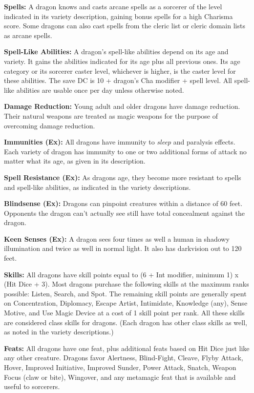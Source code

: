 \documentclass{article}
\begin{document}
\textbf{Spells:} A dragon knows and casts arcane spells as a sorcerer of the level 
indicated in its variety description, gaining bonus spells for a high Charisma 
score. Some dragons can also cast spells from the cleric list or cleric domain 
lists as arcane spells.

\textbf{Spell-Like Abilities:} A dragon's spell-like abilities depend on its age 
and variety. It gains the abilities indicated for its age plus all previous ones. 
Its age category or its sorcerer caster level, whichever is higher, is the caster 
level for these abilities. The save DC is 10 + dragon's Cha modifier + spell level. 
All spell-like abilities are usable once per day unless otherwise noted.

\textbf{Damage Reduction:} Young adult and older dragons have damage reduction. 
Their natural weapons are treated as magic weapons for the purpose of overcoming 
damage reduction.

\textbf{Immunities (Ex):} All dragons have immunity to \textit{sleep }and paralysis 
effects. Each variety of dragon has immunity to one or two additional forms of 
attack no matter what its age, as given in its description.

\textbf{Spell Resistance (Ex):} As dragons age, they become more resistant to spells 
and spell-like abilities, as indicated in the variety descriptions.

\textbf{Blindsense (Ex):} Dragons can pinpoint creatures within a distance of 60 
feet. Opponents the dragon can't actually see still have total concealment against 
the dragon.

\textbf{Keen Senses (Ex):} A dragon sees four times as well a human in shadowy 
illumination and twice as well in normal light. It also has darkvision out to 120 
feet.

\textbf{Skills:} All dragons have skill points equal to (6 + Int modifier, minimum 
1) x (Hit Dice + 3). Most dragons purchase the following skills at the maximum 
ranks possible: Listen, Search, and Spot. The remaining skill points are generally 
spent on Concentration, Diplomacy, Escape Artist, Intimidate, Knowledge (any), 
Sense Motive, and Use Magic Device at a cost of 1 skill point per rank. All these 
skills are considered class skills for dragons. (Each dragon has other class skills 
as well, as noted in the variety descriptions.)

\textbf{Feats:} All dragons have one feat, plus additional feats based on Hit Dice 
just like any other creature. Dragons favor Alertness, Blind-Fight, Cleave, Flyby 
Attack, Hover, Improved Initiative, Improved Sunder, Power Attack, Snatch, Weapon 
Focus (claw or bite), Wingover, and any metamagic feat that is available and useful 
to sorcerers.
\end{document}
